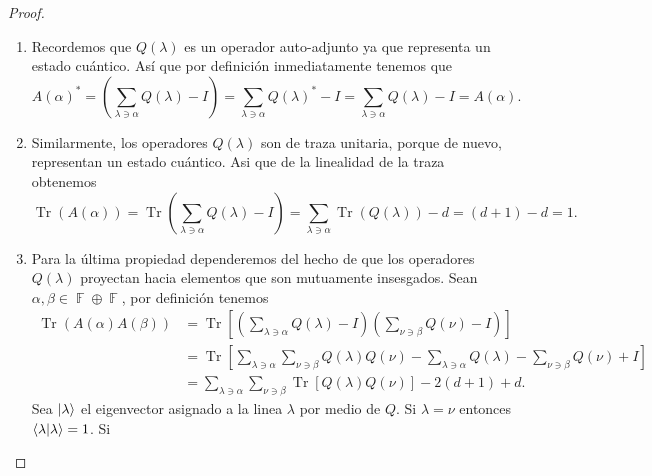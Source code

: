 \documentclass[a4paper]{report}
\DeclareMathOperator{\F}{\mathbb{F}}
\DeclareMathOperator{\Tr}{Tr}
\begin{document}
  \begin{proof}
    ${}$
    \begin{enumerate}
      \item Recordemos que $Q(\lambda)$ es un operador
        auto-adjunto ya que representa un estado cuántico.
        Así que por definición inmediatamente tenemos que
        \begin{equation}
          A(\alpha)^{*}
          = \left( \sum_{\lambda \ni \alpha}^{} Q(\lambda)
          - I\right)
          = \sum_{\lambda \ni \alpha}^{} Q(\lambda)^{*} - I
          = \sum_{\lambda \ni \alpha}^{} Q(\lambda) - I
          = A(\alpha).
        \end{equation}
      \item Similarmente, los operadores $Q(\lambda)$ son de
        traza unitaria, porque de nuevo, representan un
        estado cuántico. Asi que de la linealidad de la
        traza obtenemos
        \begin{equation}
          \Tr(A(\alpha))
          = \Tr\left( \sum_{\lambda \ni \alpha}^{}
          Q(\lambda) - I \right) 
          = \sum_{\lambda \ni \alpha}^{} \Tr(Q(\lambda)) - d
          = (d+1) - d
          = 1.
        \end{equation}
      \item Para la última propiedad dependeremos del hecho
        de que los operadores $Q(\lambda)$ proyectan hacia
        elementos que son mutuamente insesgados. Sean
        $\alpha, \beta \in \F \oplus \F$, por definición
        tenemos
        \begin{align}
          \Tr\left( A(\alpha)A(\beta) \right) 
          &= \Tr\left[
            \left(
              \sum_{\lambda \ni \alpha}^{} Q(\lambda) - I
            \right) 
            \left( 
              \sum_{\nu \ni \beta}^{} Q(\nu) - I
            \right) 
          \right] \\
          &= \Tr\left[
            \sum_{\lambda \ni \alpha}^{}
            \sum_{\nu \ni \beta}^{}
            Q(\lambda)Q(\nu) - \sum_{\lambda \ni \alpha}^{}
            Q(\lambda) - \sum_{\nu \ni \beta}^{} Q(\nu) + I
          \right] \\
          &= \sum_{\lambda \ni \alpha}^{} 
          \sum_{\nu \ni \beta}^{}
          \Tr\left[Q(\lambda)Q(\nu)\right]
          - 2(d+1) + d. \label{eqn:trace_point_ops}
        \end{align}
        Sea $\ket \lambda$ el eigenvector asignado a la
        linea $\lambda$ por medio de $Q$.  Si $\lambda =
        \nu$ entonces $\braket{\lambda|\lambda} = 1$. Si

\end{enumerate}
\end{proof}
\end{document}
